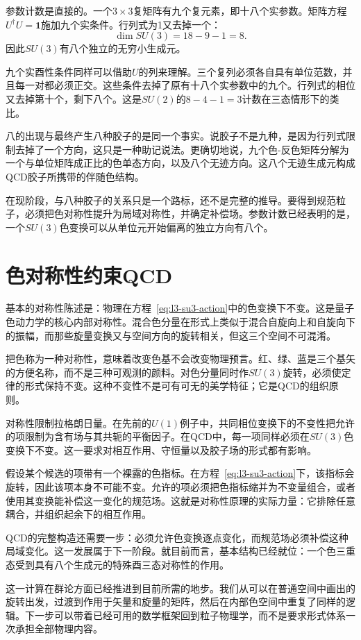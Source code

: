 参数计数是直接的。一个\(3\times3\)复矩阵有九个复元素，即十八个实参数。矩阵方程\(U^\dagger U=\boldsymbol 1\)施加九个实条件。行列式为1又去掉一个：
\begin{equation}
\dim SU(3)=18-9-1=8.
\end{equation}
因此\(SU(3)\)有八个独立的无穷小生成元。

九个实酉性条件同样可以借助\(U\)的列来理解。三个复列必须各自具有单位范数，并且每一对都必须正交。这些条件去掉了原有十八个实参数中的九个。行列式的相位又去掉第十个，剩下八个。这是\(SU(2)\)的\(8-4-1=3\)计数在三态情形下的类比。

八的出现与最终产生八种胶子的是同一个事实。说胶子不是九种，是因为行列式限制去掉了一个方向，这只是一种助记说法。更确切地说，九个色-反色矩阵分解为一个与单位矩阵成正比的色单态方向，以及八个无迹方向。这八个无迹生成元构成QCD胶子所携带的伴随色结构。

在现阶段，与八种胶子的关系只是一个路标，还不是完整的推导。要得到规范粒子，必须把色对称性提升为局域对称性，并确定补偿场。参数计数已经表明的是，一个\(SU(3)\)色变换可以从单位元开始偏离的独立方向有八个。

\section{色对称性约束QCD}

基本的对称性陈述是：物理在方程~\eqref{eq:l3-su3-action}中的色变换下不变。这是量子色动力学的核心内部对称性。混合色分量在形式上类似于混合自旋向上和自旋向下的振幅，而那些旋量变换又与空间方向的旋转相关，但这三个空间不可混淆。

把色称为一种对称性，意味着改变色基不会改变物理预言。红、绿、蓝是三个基矢的方便名称，而不是三种可观测的颜料。对色分量同时作\(SU(3)\)旋转，必须使定律的形式保持不变。这种不变性不是可有可无的美学特征；它是QCD的组织原则。

对称性限制拉格朗日量。在先前的\(U(1)\)例子中，共同相位变换下的不变性把允许的项限制为含有场与其共轭的平衡因子。在QCD中，每一项同样必须在\(SU(3)\)色变换下不变。这一要求对相互作用、守恒量以及胶子场的形式都有影响。

假设某个候选的项带有一个裸露的色指标。在方程~\eqref{eq:l3-su3-action}下，该指标会旋转，因此该项本身不可能不变。允许的项必须把色指标缩并为不变量组合，或者使用其变换能补偿这一变化的规范场。这就是对称性原理的实际力量：它排除任意耦合，并组织起余下的相互作用。

QCD的完整构造还需要一步：必须允许色变换逐点变化，而规范场必须补偿这种局域变化。这一发展属于下一阶段。就目前而言，基本结构已经就位：一个色三重态受到具有八个生成元的特殊酉三态对称性的作用。

这一计算在群论方面已经推进到目前所需的地步。我们从可以在普通空间中画出的旋转出发，过渡到作用于矢量和旋量的矩阵，然后在内部色空间中重复了同样的逻辑。下一步可以带着已经可用的数学框架回到粒子物理学，而不是要求形式体系一次承担全部物理内容。